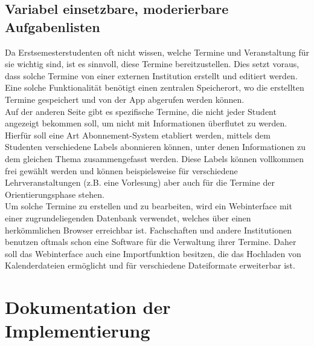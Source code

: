 \documentclass[noindent]{tudreport}
\begin{document}
		\section{Variabel einsetzbare, moderierbare Aufgabenlisten}\label{sec:todo_list}
			Da Erstsemesterstudenten oft nicht wissen, welche Termine und Veranstaltung für sie wichtig sind, ist es sinnvoll, diese Termine bereitzustellen. Dies setzt voraus, dass solche Termine von einer externen Institution erstellt und editiert werden. Eine solche Funktionalität benötigt einen zentralen Speicherort, wo die erstellten Termine gespeichert und von der App abgerufen werden können.\\
			Auf der anderen Seite gibt es spezifische Termine, die nicht jeder Student angezeigt bekommen soll, um nicht mit Informationen überflutet zu werden. Hierfür soll eine Art Abonnement-System etabliert werden, mittels dem Studenten verschiedene Labels abonnieren können, unter denen Informationen zu dem gleichen Thema zusammengefasst werden. Diese Labels können vollkommen frei gewählt werden und können beispielsweise für verschiedene Lehrveranstaltungen (z.B. eine Vorlesung) aber auch für die Termine der Orientierungsphase stehen.\\
			Um solche Termine zu erstellen und zu bearbeiten, wird ein Webinterface mit einer zugrundeliegenden Datenbank verwendet, welches über einen herkömmlichen Browser erreichbar ist. Fachschaften und andere Institutionen benutzen oftmals schon eine Software für die Verwaltung ihrer Termine. Daher soll das Webinterface auch eine Importfunktion besitzen, die das Hochladen von Kalenderdateien ermöglicht und für verschiedene Dateiformate erweiterbar ist.
		
	\chapter{Dokumentation der Implementierung}\label{chap:documentation}
\end{document}
